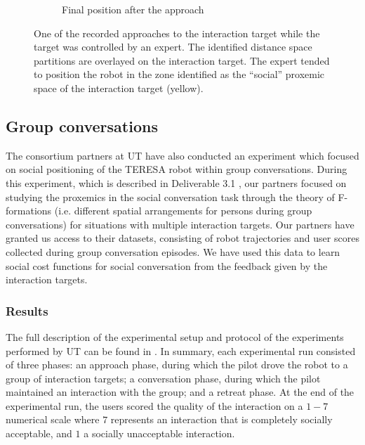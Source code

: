 \documentclass[a4paper,11pt]{report}
\begin{document}
\begin{figure}
\begin{subfigure}[b]{0.45\textwidth}
        \caption{Final position after the approach}
        \label{fig:cost_function_2}
    \end{subfigure}   
    \caption{One of the recorded approaches to the interaction target while the target was controlled by an expert. The identified distance space partitions are overlayed on the interaction target. The expert tended to position the robot in the zone identified as the ``social'' proxemic space of the interaction target (yellow).}
    \label{fig:cost_function}
\end{figure}


\subsection{Group conversations}
\label{sec:group conversations}

The consortium partners at UT have also conducted an experiment which focused on social positioning of the TERESA robot within group conversations. During this experiment, which is described in Deliverable 3.1 \cite{d3.1}, our partners focused on studying the proxemics in the social conversation task through the theory of F-formations\cite{kendon1990conducting} (i.e. different spatial arrangements for persons during group conversations) for situations with multiple interaction targets. Our partners have granted us access to their datasets, consisting of robot trajectories and user scores collected during group conversation episodes. We have used this data to learn social cost functions for social conversation from the feedback given by the interaction targets.

\subsubsection{Results}
\label{sec:group_result}

The full description of the experimental setup and protocol of the experiments performed by UT can be found in \cite{d3.1}. In summary, each experimental run consisted of three phases: an approach phase, during which the pilot drove the robot to a group of interaction targets; a conversation phase, during which the pilot maintained an interaction with the group; and a retreat phase. At the end of the experimental run, the users scored the quality of the interaction on a $1-7$ numerical scale where $7$ represents an interaction that is completely socially acceptable, and $1$ a socially unacceptable interaction.
\end{document}
